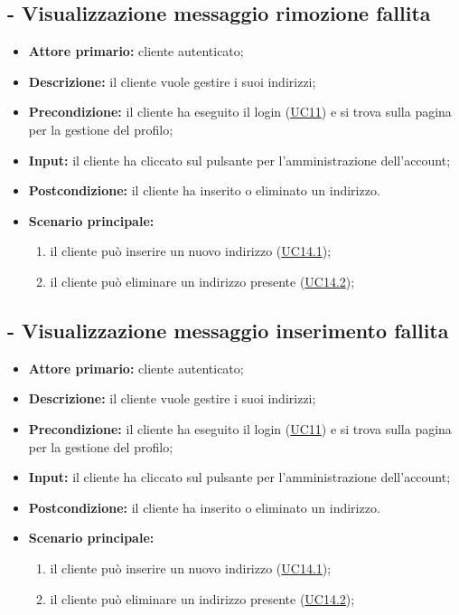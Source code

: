 \stepUserCase
\subsection{ - Visualizzazione messaggio rimozione fallita}
\begin{itemize}
    \item \textbf{Attore primario:} cliente autenticato;
    \item \textbf{Descrizione:} il cliente vuole gestire i suoi indirizzi;
    \item \textbf{Precondizione:} il cliente ha eseguito il login (\hyperref[UC11]{UC11}) e si trova sulla pagina per la gestione del profilo;
    \item \textbf{Input:} il cliente ha cliccato sul pulsante per l'amministrazione dell'account;
    \item \textbf{Postcondizione:} il cliente ha inserito o eliminato un indirizzo.
    \item \textbf{Scenario principale:}
          \begin{enumerate}
              \item il cliente può inserire un nuovo indirizzo (\hyperref[UC14.1]{UC14.1});
              \item il cliente può eliminare un indirizzo presente (\hyperref[UC14.2]{UC14.2});
          \end{enumerate}
\end{itemize}

\stepUserCase
\subsection{ - Visualizzazione messaggio inserimento fallita}
\begin{itemize}
    \item \textbf{Attore primario:} cliente autenticato;
    \item \textbf{Descrizione:} il cliente vuole gestire i suoi indirizzi;
    \item \textbf{Precondizione:} il cliente ha eseguito il login (\hyperref[UC11]{UC11}) e si trova sulla pagina per la gestione del profilo;
    \item \textbf{Input:} il cliente ha cliccato sul pulsante per l'amministrazione dell'account;
    \item \textbf{Postcondizione:} il cliente ha inserito o eliminato un indirizzo.
    \item \textbf{Scenario principale:}
          \begin{enumerate}
              \item il cliente può inserire un nuovo indirizzo (\hyperref[UC14.1]{UC14.1});
              \item il cliente può eliminare un indirizzo presente (\hyperref[UC14.2]{UC14.2});
          \end{enumerate}
\end{itemize}

